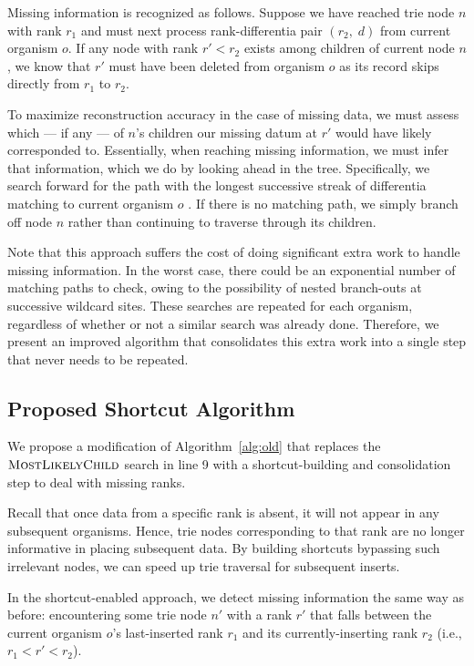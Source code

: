 

Missing information is recognized as follows.
Suppose we have reached trie node $n$ with rank $r_1$ and must next process rank-differentia pair $(r_2,\; d)$ from current organism $o$.
If any node with rank $r' < r_2$ exists among children of current node $n$, we know that $r'$ must have been deleted from organism $o$ as its record skips directly from $r_1$ to $r_2$.

To maximize reconstruction accuracy in the case of missing data, we must assess which --- if any --- of $n$'s children our missing datum at $r'$ would have likely corresponded to.
Essentially, when reaching missing information, we must infer that information, which we do by looking ahead in the tree.
Specifically, we search forward for the path with the longest successive streak of differentia matching to current organism $o$ \citep{moreno2024analysis}.
If there is no matching path, we simply branch off node $n$ rather than continuing to traverse through its children.

Note that this approach suffers the cost of doing significant extra work to handle missing information.
In the worst case, there could be an exponential number of matching paths to check, owing to the possibility of nested branch-outs at successive wildcard sites.
These searches are repeated for each organism, regardless of whether or not a similar search was already done.
Therefore, we present an improved algorithm that consolidates this extra work into a single step that never needs to be repeated.

\subsection{Proposed Shortcut Algorithm} \label{sec:algorithm:shortcut}



We propose a modification of Algorithm~\ref{alg:old} that replaces the $\textsc{MostLikelyChild}$ search in line 9 with a shortcut-building and consolidation step to deal with missing ranks.

Recall that once data from a specific rank is absent, it will not appear in any subsequent organisms.
Hence, trie nodes corresponding to that rank are no longer informative in placing subsequent data.
By building shortcuts bypassing such irrelevant nodes, we can speed up trie traversal for subsequent inserts.

In the shortcut-enabled approach, we detect missing information the same way as before: encountering some trie node $n'$ with a rank $r'$ that falls between the current organism $o$'s last-inserted rank $r_1$ and its currently-inserting rank $r_2$ (i.e., $r_1 < r' < r_2$).

